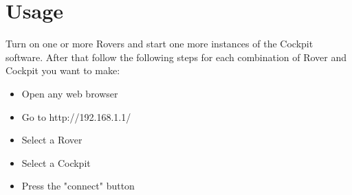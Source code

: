\section{Usage}
Turn on one or more Rovers and start one more instances of the Cockpit software. After that follow the following steps for each combination of Rover and Cockpit you want to make:

\begin{itemize}
	\item Open any web browser
	\item Go to http://192.168.1.1/
	\item Select a Rover
	\item Select a Cockpit	
	\item Press the "connect" button
\end{itemize}
